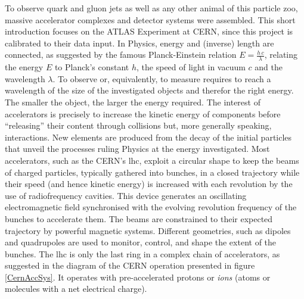 To observe quark and gluon jets as well as any other animal of this particle zoo, massive accelerator complexes and detector systems were assembled. This short introduction focuses on the ATLAS Experiment at CERN, since this project is calibrated to their data input. In Physics, energy and (inverse) length are connected, as suggested by the famous Planck-Einstein relation $E = \frac{h \, c}{\lambda}$, relating the energy $E$ to Planck's constant $h$, the speed of light in vacuum $c$ and the wavelength $\lambda$. To observe or, equivalently, to measure requires to reach a wavelength of the size of the investigated objects and therefor the right energy. The smaller the object, the larger the energy required. The interest of accelerators is precisely to increase the kinetic energy of components before ``releasing'' their content through collisions but, more generally speaking, interactions. New elements are produced from the decay of the initial particles that unveil the processes ruling Physics at the energy investigated. Most accelerators, such as the CERN's \gls{lhc}, exploit a circular shape to keep the beams of charged particles, typically gathered into bunches, in a closed trajectory while their speed (and hence kinetic energy) is increased with each revolution by the use of radiofrequency cavities. This device generates an oscillating electromagnetic field synchronised with the evolving revolution frequency of the bunches to accelerate them. The beams are constrained to their expected trajectory by powerful magnetic systems. Different geometries, such as dipoles and quadrupoles are used to monitor, control, and shape the extent of the bunches. The \gls{lhc} is only the last ring in a complex chain of accelerators, as suggested in the diagram of the CERN operation presented in figure \ref{CernAccSys}. It operates with pre-accelerated protons or \textit{ions} (atoms or molecules with a net electrical charge). 

